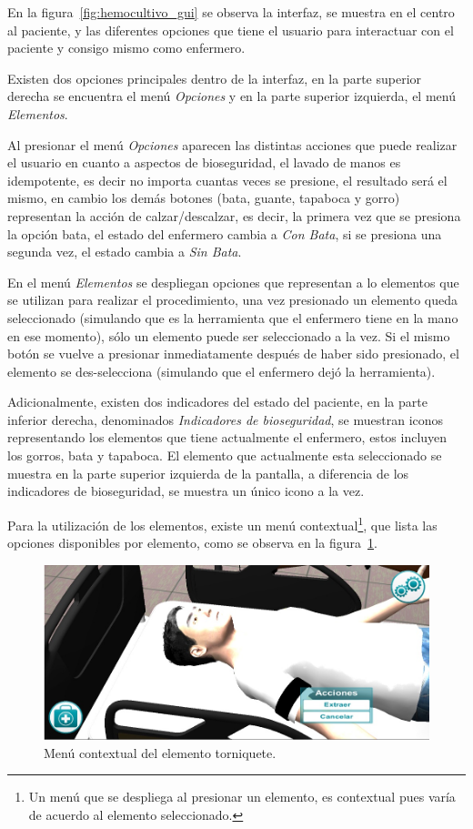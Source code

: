 En la figura~\ref{fig:hemocultivo_gui} se observa la interfaz, se muestra en el
centro al paciente, y las diferentes opciones que tiene el usuario para
interactuar con el paciente y consigo mismo como enfermero.

Existen dos opciones principales dentro de la interfaz, en la parte superior
derecha se encuentra el menú \emph{Opciones} y en la parte superior izquierda, el menú
\emph{Elementos}.

Al presionar el menú \emph{Opciones} aparecen las distintas
acciones que puede realizar el usuario en cuanto a aspectos de bioseguridad, el 
lavado de manos es idempotente, es decir no importa cuantas veces se presione, el 
resultado será el mismo, en cambio los demás botones (bata, guante, tapaboca y gorro)
representan la acción de calzar/descalzar, es decir, la primera vez que se presiona
la opción bata, el estado del enfermero cambia a \emph{Con Bata}, si se presiona una
segunda vez, el estado cambia a \emph{Sin Bata}.

En el menú \emph{Elementos} se despliegan opciones que representan a lo elementos que se
utilizan para realizar el procedimiento, una vez presionado un elemento queda
seleccionado (simulando que es la herramienta que el enfermero tiene en la mano
en ese momento), sólo un elemento puede ser seleccionado a la vez. Si el mismo
botón se vuelve a presionar inmediatamente después de haber sido presionado, el
elemento se des-selecciona (simulando que el enfermero dejó la herramienta).

Adicionalmente, existen dos indicadores del estado del paciente, en la parte
inferior derecha, denominados \emph{Indicadores de bioseguridad}, se muestran
iconos representando los elementos que tiene actualmente el enfermero, estos
incluyen los gorros, bata y tapaboca. El elemento que actualmente esta
seleccionado se muestra en la parte superior izquierda de la pantalla, a
diferencia de los indicadores de bioseguridad, se muestra un único icono a la vez.

Para la utilización de los elementos, existe un menú contextual\footnote{Un menú
    que se despliega al presionar un elemento, es contextual pues varía de
    acuerdo al elemento seleccionado.}, que lista las opciones disponibles por
elemento, como se observa en la figura~\ref{fig:hemocultivo_torniquete_cm}.

\begin{figure}
\centering
\includegraphics[scale=0.5]{propuesta/hemocultivo_contextual.jpg}
\caption{Menú contextual del elemento torniquete.}
\label{fig:hemocultivo_torniquete_cm}
\end{figure}

